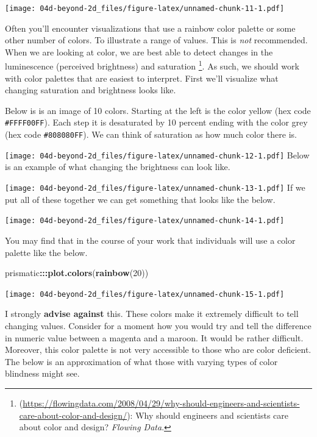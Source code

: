 \documentclass[
]{book}
\newenvironment{Shaded}{\begin{snugshade}}{\end{snugshade}}
\newcommand{\DecValTok}[1]{\textcolor[rgb]{0.00,0.00,0.81}{#1}}
\newcommand{\KeywordTok}[1]{\textcolor[rgb]{0.13,0.29,0.53}{\textbf{#1}}}
\newcommand{\NormalTok}[1]{#1}
\newcommand{\OperatorTok}[1]{\textcolor[rgb]{0.81,0.36,0.00}{\textbf{#1}}}
\begin{document}
\texttt{[image: 04d-beyond-2d\_files/figure-latex/unnamed-chunk-11-1.pdf]}

Often you'll encounter visualizations that use a rainbow color palette or some other number of colors. To illustrate a range of values. This is \emph{not} recommended. When we are looking at color, we are best able to detect changes in the luminescence (perceived brightness) and saturation \footnote{(\url{https://flowingdata.com/2008/04/29/why-should-engineers-and-scientists-care-about-color-and-design/}): Why should engineers and scientists care about color and design? \emph{Flowing Data}.}. As such, we should work with color palettes that are easiest to interpret. First we'll visualize what changing saturation and brightness looks like.

Below is is an image of 10 colors. Starting at the left is the color yellow (hex code \texttt{\#FFFF00FF}). Each step it is desaturated by 10 percent ending with the color grey (hex code \texttt{\#808080FF}). We can think of saturation as how much color there is.

\texttt{[image: 04d-beyond-2d\_files/figure-latex/unnamed-chunk-12-1.pdf]}
Below is an example of what changing the brightness can look like.

\texttt{[image: 04d-beyond-2d\_files/figure-latex/unnamed-chunk-13-1.pdf]}
If we put all of these together we can get something that looks like the below.

\texttt{[image: 04d-beyond-2d\_files/figure-latex/unnamed-chunk-14-1.pdf]}

You may find that in the course of your work that individuals will use a color palette like the below.

\begin{Shaded}
\begin{Highlighting}[]
\NormalTok{prismatic}\OperatorTok{:::}\KeywordTok{plot.colors}\NormalTok{(}\KeywordTok{rainbow}\NormalTok{(}\DecValTok{20}\NormalTok{))}
\end{Highlighting}
\end{Shaded}

\texttt{[image: 04d-beyond-2d\_files/figure-latex/unnamed-chunk-15-1.pdf]}

I strongly \textbf{advise against} this. These colors make it extremely difficult to tell changing values. Consider for a moment how you would try and tell the difference in numeric value between a magenta and a maroon. It would be rather difficult. Moreover, this color palette is not very accessible to those who are color deficient. The below is an approximation of what those with varying types of color blindness might see.
\end{document}
